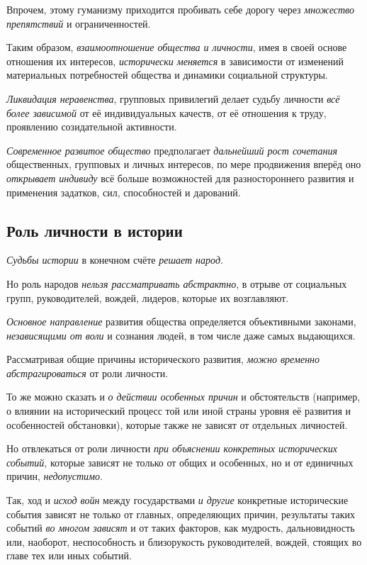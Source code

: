 \documentclass[a4paper,14pt,russian]{extreport}
\begin{document}
Впрочем, этому гуманизму приходится пробивать себе дорогу через \emph{множество препятствий} и ограниченностей.

Таким образом, \emph{взаимоотношение общества и личности}, имея в своей основе отношения их интересов, \emph{исторически меняется} в зависимости от изменений материальных потребностей общества и динамики социальной структуры.

\emph{Ликвидация неравенства}, групповых привилегий делает судьбу личности \emph{всё более зависимой} от её индивидуальных качеств, от её отношения к труду, проявлению созидательной активности.

\emph{Современное развитое общество} предполагает \emph{дальнейший рост сочетания} общественных, групповых и личных интересов, по мере продвижения вперёд оно \emph{открывает индивиду} всё больше возможностей для разностороннего развития и применения задатков, сил, способностей и дарований.

\subsection{Роль личности в истории}

\emph{Судьбы истории} в конечном счёте \emph{решает народ}.

Но роль народов \emph{нельзя рассматривать абстрактно}, в отрыве от социальных групп, руководителей, вождей, лидеров, которые их возглавляют.

\emph{Основное направление} развития общества определяется объективными законами, \emph{независящими от воли} и сознания людей, в том числе даже самых выдающихся.

Рассматривая общие причины исторического развития, \emph{можно временно абстрагироваться} от роли личности.

То же можно сказать и \emph{о действии особенных причин} и обстоятельств (например, о влиянии на исторический процесс той или иной страны уровня её развития и особенностей обстановки), которые также не зависят от отдельных личностей.

Но отвлекаться от роли личности \emph{при объяснении конкретных исторических событий}, которые зависят не только от общих и особенных, но и от единичных причин, \emph{недопустимо}.

Так, ход и \emph{исход войн} между государствами \emph{и другие} конкретные исторические события зависят не только от главных, определяющих причин, результаты таких событий \emph{во многом зависят} и от таких факторов, как мудрость, дальновидность или, наоборот, неспособность и близорукость руководителей, вождей, стоящих во главе тех или иных событий.
\end{document}
